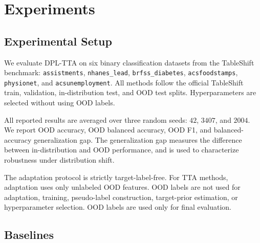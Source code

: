 

\section{Experiments}

\subsection{Experimental Setup}

We evaluate DPL-TTA on six binary classification datasets from the TableShift benchmark:
\texttt{assistments}, \texttt{nhanes\_lead}, \texttt{brfss\_diabetes}, \texttt{acsfoodstamps}, \texttt{physionet}, and \texttt{acsunemployment}. All methods follow the official TableShift train, validation, in-distribution test, and OOD test splits. Hyperparameters are selected without using OOD labels.

All reported results are averaged over three random seeds: $42$, $3407$, and $2004$. We report OOD accuracy, OOD balanced accuracy, OOD F1, and balanced-accuracy generalization gap. The generalization gap measures the difference between in-distribution and OOD performance, and is used to characterize robustness under distribution shift.

The adaptation protocol is strictly target-label-free. For TTA methods, adaptation uses only unlabeled OOD features. OOD labels are not used for adaptation, training, pseudo-label construction, target-prior estimation, or hyperparameter selection. OOD labels are used only for final evaluation.

\subsection{Baselines}

